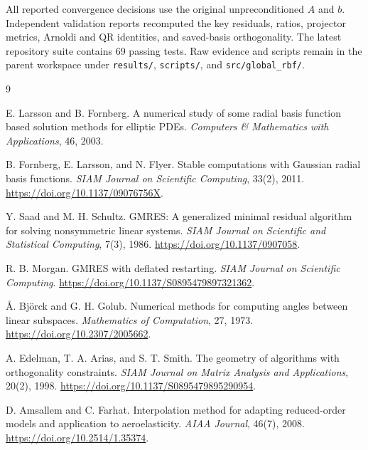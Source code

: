 \documentclass[11pt]{article}
\begin{document}
All reported convergence decisions use the original unpreconditioned $A$ and $b$. Independent validation reports recomputed the key residuals, ratios, projector metrics, Arnoldi and QR identities, and saved-basis orthogonality. The latest repository suite contains 69 passing tests. Raw evidence and scripts remain in the parent workspace under \texttt{results/}, \texttt{scripts/}, and \texttt{src/global\_rbf/}.

\begin{thebibliography}{9}

E. Larsson and B. Fornberg.
\newblock A numerical study of some radial basis function based solution methods for elliptic PDEs.
\newblock \emph{Computers \& Mathematics with Applications}, 46, 2003.

B. Fornberg, E. Larsson, and N. Flyer.
\newblock Stable computations with Gaussian radial basis functions.
\newblock \emph{SIAM Journal on Scientific Computing}, 33(2), 2011.
\newblock \url{https://doi.org/10.1137/09076756X}.

Y. Saad and M. H. Schultz.
\newblock GMRES: A generalized minimal residual algorithm for solving nonsymmetric linear systems.
\newblock \emph{SIAM Journal on Scientific and Statistical Computing}, 7(3), 1986.
\newblock \url{https://doi.org/10.1137/0907058}.

R. B. Morgan.
\newblock GMRES with deflated restarting.
\newblock \emph{SIAM Journal on Scientific Computing}.
\newblock \url{https://doi.org/10.1137/S0895479897321362}.

\AA. Bj\"orck and G. H. Golub.
\newblock Numerical methods for computing angles between linear subspaces.
\newblock \emph{Mathematics of Computation}, 27, 1973.
\newblock \url{https://doi.org/10.2307/2005662}.

A. Edelman, T. A. Arias, and S. T. Smith.
\newblock The geometry of algorithms with orthogonality constraints.
\newblock \emph{SIAM Journal on Matrix Analysis and Applications}, 20(2), 1998.
\newblock \url{https://doi.org/10.1137/S0895479895290954}.

D. Amsallem and C. Farhat.
\newblock Interpolation method for adapting reduced-order models and application to aeroelasticity.
\newblock \emph{AIAA Journal}, 46(7), 2008.
\newblock \url{https://doi.org/10.2514/1.35374}.

\end{thebibliography}
\end{document}
